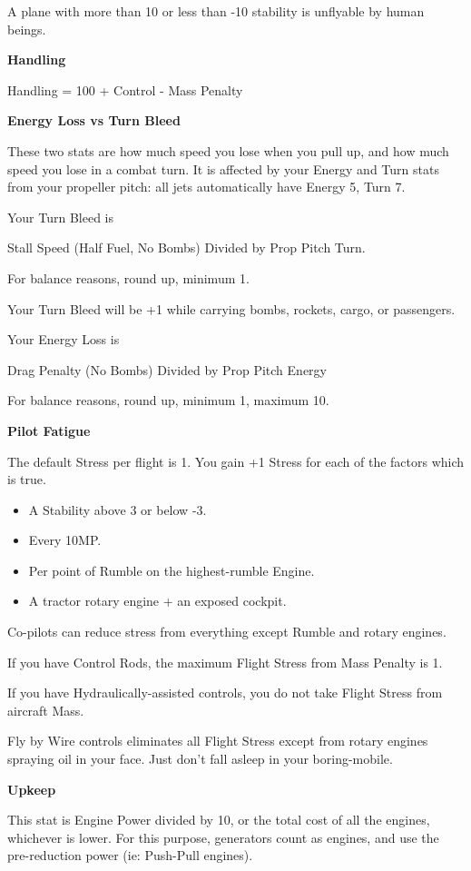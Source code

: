 \documentclass{article}
\begin{document}
A plane with more than 10 or less than -10 stability is unflyable
by human beings.

\textbf{Handling}

Handling = 100 + Control - Mass Penalty

\textbf{Energy Loss vs Turn Bleed}

These two stats are how much speed you lose when you pull up, and
how much speed you lose in a combat turn. It is affected by your Energy
and Turn stats from your propeller pitch: all jets automatically have
Energy 5, Turn 7.

Your Turn Bleed is

Stall Speed (Half Fuel, No Bombs) Divided by Prop Pitch Turn.

For balance reasons, round up, minimum 1.

Your Turn Bleed will be +1 while carrying bombs, rockets, cargo,
or passengers.

Your Energy Loss is

Drag Penalty (No Bombs) Divided by Prop Pitch Energy

For balance reasons, round up, minimum 1, maximum 10.

\textbf{Pilot Fatigue}

The default Stress per flight is 1. You gain +1 Stress for each
of the factors which is true.

\begin{itemize}
    \item A Stability above 3 or below -3.
    \item Every 10MP.
    \item Per point of Rumble on the highest-rumble Engine.
    \item A tractor rotary engine + an exposed cockpit.
\end{itemize}

Co-pilots can reduce stress from everything except Rumble and
rotary engines.

If you have Control Rods, the maximum Flight Stress from Mass
Penalty is 1.

If you have Hydraulically-assisted controls, you do not take
Flight Stress from aircraft Mass.

Fly by Wire controls eliminates all Flight Stress except from
rotary engines spraying oil in your face. Just don't fall asleep in your
boring-mobile.

\textbf{Upkeep}

This stat is Engine Power divided by 10, or the total cost of all
the engines, whichever is lower.  For this purpose, generators count
as engines, and use the pre-reduction power (ie: Push-Pull engines).
\end{document}

